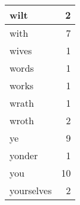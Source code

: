 \begin{center}
\begin{longtable}{l|r}
wilt & 2 \\ \hline
with & 7 \\ \hline
wives & 1 \\ \hline
words & 1 \\ \hline
works & 1 \\ \hline
wrath & 1 \\ \hline
wroth & 2 \\ \hline
ye & 9 \\ \hline
yonder & 1 \\ \hline
you & 10 \\ \hline
yourselves & 2 \\ \hline
\end{longtable}
\end{center}



\normalsize



